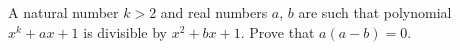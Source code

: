 \problem
A natural number $k > 2$ and real numbers $a$, $b$ are such that polynomial
$x^k + a x + 1$ is divisible by $x^2 + b x + 1$.
Prove that $a (a - b) = 0$.
\solution
\endproblem
